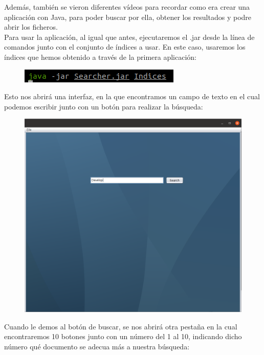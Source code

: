 Además, también se vieron diferentes vídeos para recordar como era crear una aplicación con Java, para poder buscar por ella, obtener los resultados y podre abrir los ficheros.\\

Para usar la aplicación, al igual que antes, ejecutaremos el .jar desde la línea de comandos junto con el conjunto de índices a usar. En este caso, usaremos los índices que hemos obtenido a través de la primera aplicación:

\begin{figure}[H]
	\centering
	\includegraphics[width=0.4\linewidth]{Imagenes/screenshot004}
	\label{fig:screenshot004}
\end{figure}

Esto nos abrirá una interfaz, en la que encontramos un campo de texto en el cual podemos escribir junto con un botón para realizar la búsqueda:

\begin{figure}[H]
	\centering
	\includegraphics[width=0.7\linewidth]{Imagenes/screenshot005}
	\label{fig:screenshot005}
\end{figure}

Cuando le demos al botón de buscar, se nos abrirá otra pestaña en la cual encontraremos 10 botones junto con un número del 1 al 10, indicando dicho número qué documento se adecua más a nuestra búsqueda:


